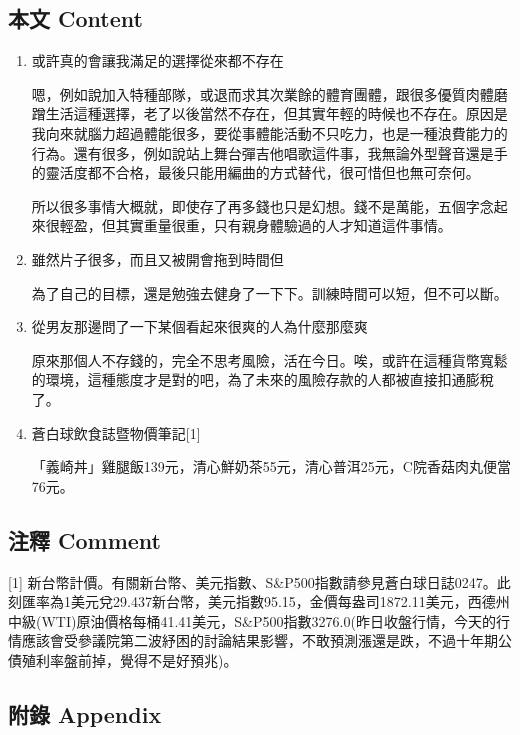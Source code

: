 \documentclass[
]{article}
\begin{document}
\hypertarget{ux672cux6587-content-22}{%
\subsection{本文 Content}\label{ux672cux6587-content-22}}

\begin{enumerate}
\def\labelenumi{\arabic{enumi}.}
\item
  或許真的會讓我滿足的選擇從來都不存在

  嗯，例如說加入特種部隊，或退而求其次業餘的體育團體，跟很多優質肉體磨蹭生活這種選擇，老了以後當然不存在，但其實年輕的時候也不存在。原因是我向來就腦力超過體能很多，要從事體能活動不只吃力，也是一種浪費能力的行為。還有很多，例如說站上舞台彈吉他唱歌這件事，我無論外型聲音還是手的靈活度都不合格，最後只能用編曲的方式替代，很可惜但也無可奈何。

  所以很多事情大概就，即使存了再多錢也只是幻想。錢不是萬能，五個字念起來很輕盈，但其實重量很重，只有親身體驗過的人才知道這件事情。
\item
  雖然片子很多，而且又被開會拖到時間但

  為了自己的目標，還是勉強去健身了一下下。訓練時間可以短，但不可以斷。
\item
  從男友那邊問了一下某個看起來很爽的人為什麼那麼爽

  原來那個人不存錢的，完全不思考風險，活在今日。唉，或許在這種貨幣寬鬆的環境，這種態度才是對的吧，為了未來的風險存款的人都被直接扣通膨稅了。
\item
  蒼白球飲食誌暨物價筆記{[}1{]}

  「義崎丼」雞腿飯139元，清心鮮奶茶55元，清心普洱25元，C院香菇肉丸便當76元。
\end{enumerate}

\hypertarget{ux6ce8ux91cb-comment-22}{%
\subsection{注釋 Comment}\label{ux6ce8ux91cb-comment-22}}

{[}1{]}
新台幣計價。有關新台幣、美元指數、S\&P500指數請參見蒼白球日誌0247。此刻匯率為1美元兌29.437新台幣，美元指數95.15，金價每盎司1872.11美元，西德州中級(WTI)原油價格每桶41.41美元，S\&P500指數3276.0(昨日收盤行情，今天的行情應該會受參議院第二波紓困的討論結果影響，不敢預測漲還是跌，不過十年期公債殖利率盤前掉，覺得不是好預兆)。

\hypertarget{ux9644ux9304-appendix-22}{%
\subsection{附錄 Appendix}\label{ux9644ux9304-appendix-22}}
\end{document}
